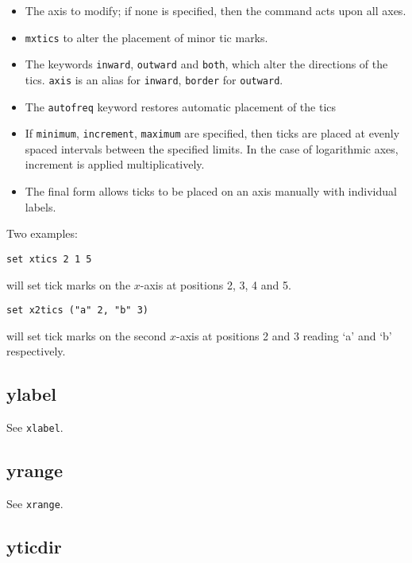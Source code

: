 \begin{itemize}
\item The axis to modify; if none is specified, then the command acts upon all axes.

\item {\tt mxtics} to alter the placement of minor tic marks.

\item The keywords {\tt inward}, {\tt outward} and {\tt both}, which alter the
directions of the tics.  {\tt axis} is an alias for {\tt inward}, {\tt border}
for {\tt outward}.

\item The {\tt autofreq} keyword restores automatic placement of the tics

\item If {\tt minimum}, {\tt increment}, {\tt maximum} are specified, then ticks
are placed at evenly spaced intervals between the specified limits. In the case
of logarithmic axes, increment is applied multiplicatively. 

\item The final form allows ticks to be placed on an axis manually with
individual labels.
\end{itemize}
   
Two examples:

\begin{verbatim}
set xtics 2 1 5
\end{verbatim}

\noindent will set tick marks on the $x$-axis at positions 2, 3, 4 and 5.

\begin{verbatim}
set x2tics ("a" 2, "b" 3)
\end{verbatim}

\noindent will set tick marks on the second $x$-axis at positions 2 and 3 reading `a' and
`b' respectively.


\subsection{ylabel}

See {\tt xlabel}.


\subsection{yrange}

See {\tt xrange}.
   

\subsection{yticdir}

